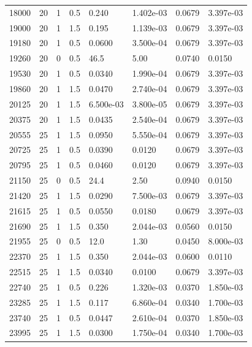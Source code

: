 \documentclass[preview]{standalone}
\begin{document}
{{{\begin{tabular}{L{1.2cm}C{1.2cm} C{0.3cm}C{0.5cm} C{1.4cm}C{1.4cm} C{1.4cm}C{1.4cm}}
  18000  &    20  & 1     & 0.5 &  0.240  & 1.402e-03  & 0.0679 &  3.397e-03   \\ 
  19000  &    20  & 1     & 1.5 &  0.195  & 1.139e-03  & 0.0679 &  3.397e-03   \\ 
  19180  &    20  & 1     & 0.5 &  0.0600  & 3.500e-04  & 0.0679 &  3.397e-03   \\ 
  19260  &    20  & 0     & 0.5 &  46.5  & 5.00  & 0.0740 &  0.0150   \\ 
  19530  &    20  & 1     & 0.5 &  0.0340  & 1.990e-04  & 0.0679 &  3.397e-03   \\ 
  19860  &    20  & 1     & 1.5 &  0.0470  & 2.740e-04  & 0.0679 &  3.397e-03   \\ 
  20125  &    20  & 1     & 1.5 &  6.500e-03  & 3.800e-05  & 0.0679 &  3.397e-03   \\ 
  20375  &    20  & 1     & 1.5 &  0.0435  & 2.540e-04  & 0.0679 &  3.397e-03   \\ 
  20555  &    25  & 1     & 1.5 &  0.0950  & 5.550e-04  & 0.0679 &  3.397e-03   \\ 
  20725  &    25  & 1     & 0.5 &  0.0390  & 0.0120  & 0.0679 &  3.397e-03   \\ 
  20795  &    25  & 1     & 0.5 &  0.0460  & 0.0120  & 0.0679 &  3.397e-03   \\ 
  21150  &    25  & 0     & 0.5 &  24.4  & 2.50  & 0.0940 &  0.0150   \\ 
  21420  &    25  & 1     & 1.5 &  0.0290  & 7.500e-03  & 0.0679 &  3.397e-03   \\ 
  21615  &    25  & 1     & 0.5 &  0.0550  & 0.0180  & 0.0679 &  3.397e-03   \\ 
  21690  &    25  & 1     & 1.5 &  0.350  & 2.044e-03  & 0.0560 &  0.0150   \\ 
  21955  &    25  & 0     & 0.5 &  12.0  & 1.30  & 0.0450 &  8.000e-03   \\ 
  22370  &    25  & 1     & 1.5 &  0.350  & 2.044e-03  & 0.0600 &  0.0110   \\ 
  22515  &    25  & 1     & 1.5 &  0.0340  & 0.0100  & 0.0679 &  3.397e-03   \\ 
  22740  &    25  & 1     & 0.5 &  0.226  & 1.320e-03  & 0.0370 &  1.850e-03   \\ 
  23285  &    25  & 1     & 1.5 &  0.117  & 6.860e-04  & 0.0340 &  1.700e-03   \\ 
  23740  &    25  & 1     & 0.5 &  0.0447  & 2.610e-04  & 0.0370 &  1.850e-03   \\ 
  23995  &    25  & 1     & 1.5 &  0.0300  & 1.750e-04  & 0.0340 &  1.700e-03   \\ 

\end{tabular}}}}
\end{document}
